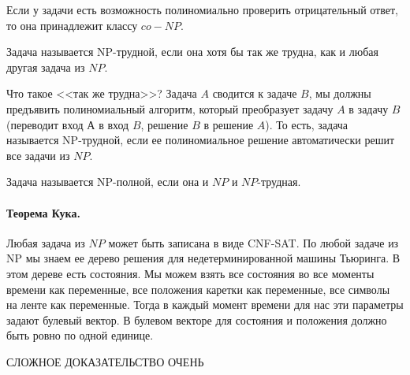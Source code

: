 \documentclass[12pt]{article}
\begin{document}
Если у задачи есть возможность полиномиально проверить отрицательный ответ, то она принадлежит классу $co-NP$. 

Задача называется NP-трудной, если она хотя бы так же трудна, как и любая другая задача из $NP$. 

Что такое <<так же трудна>>? Задача $A$ сводится к задаче $B$, мы должны предъявить полиномиальный алгоритм, который преобразует задачу $A$ в задачу $B$ (переводит вход $А$ в вход $B$, решение $B$ в решение $A$). То есть, задача называется NP-трудной, если ее полиномиальное решение автоматически решит все задачи из $NP$.

Задача называется NP-полной, если она и $NP$ и $NP$-трудная.

\paragraph{Теорема Кука.} Любая задача из $NP$ может быть записана в виде CNF-SAT. По любой задаче из NP мы знаем ее дерево решения для недетерминированной машины Тьюринга. В этом дереве есть состояния. Мы можем взять все состояния во все моменты времени как переменные, все положения каретки как переменные, все символы на ленте как переменные. Тогда в каждый момент времени для нас эти параметры задают булевый вектор. В булевом векторе для состояния и положения должно быть ровно по одной единице.


СЛОЖНОЕ ДОКАЗАТЕЛЬСТВО ОЧЕНЬ
\end{document}
